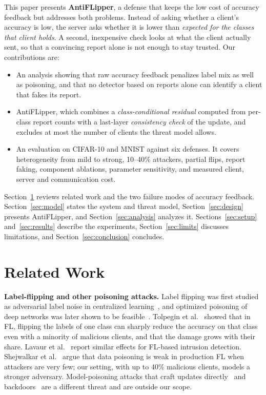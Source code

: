 \documentclass[conference]{IEEEtran}
\begin{document}
This paper presents \textbf{AntiFLipper}, a defense that keeps the low cost of accuracy feedback but addresses both problems. Instead of asking whether a client's accuracy is low, the server asks whether it is lower than \emph{expected for the classes that client holds}. A second, inexpensive check looks at what the client actually sent, so that a convincing report alone is not enough to stay trusted. Our contributions are:
\begin{itemize}
\item An analysis showing that raw accuracy feedback penalizes label mix as well as poisoning, and that no detector based on reports alone can identify a client that fakes its report.
\item AntiFLipper, which combines a \emph{class-conditional residual} computed from per-class report counts with a last-layer \emph{consistency check} of the update, and excludes at most the number of clients the threat model allows.
\item An evaluation on CIFAR-10 and MNIST against six defenses. It covers heterogeneity from mild to strong, 10--40\% attackers, partial flips, report faking, component ablations, parameter sensitivity, and measured client, server and communication cost.
\end{itemize}

Section~\ref{sec:related} reviews related work and the two failure modes of accuracy feedback. Section~\ref{sec:model} states the system and threat model, Section~\ref{sec:design} presents AntiFLipper, and Section~\ref{sec:analysis} analyzes it. Sections~\ref{sec:setup} and~\ref{sec:results} describe the experiments, Section~\ref{sec:limits} discusses limitations, and Section~\ref{sec:conclusion} concludes.

\section{Related Work}
\label{sec:related}
\textbf{Label-flipping and other poisoning attacks.} Label flipping was first studied as adversarial label noise in centralized learning~\cite{biggio2011support}, and optimized poisoning of deep networks was later shown to be feasible~\cite{munoz2017towards}. Tolpegin et al.~\cite{tolpegin2020data} showed that in FL, flipping the labels of one class can sharply reduce the accuracy on that class even with a minority of malicious clients, and that the damage grows with their share. Lavaur et al.~\cite{lavaur2024systematic} report similar effects for FL-based intrusion detection. Shejwalkar et al.~\cite{shejwalkar2022backdrawingboard} argue that data poisoning is weak in production FL when attackers are very few; our setting, with up to 40\% malicious clients, models a stronger adversary. Model-poisoning attacks that craft updates directly~\cite{fang2020local,shejwalkar2021manipulating} and backdoors~\cite{bagdasaryan2020backdoor,wang2020attack} are a different threat and are outside our scope.
\end{document}
